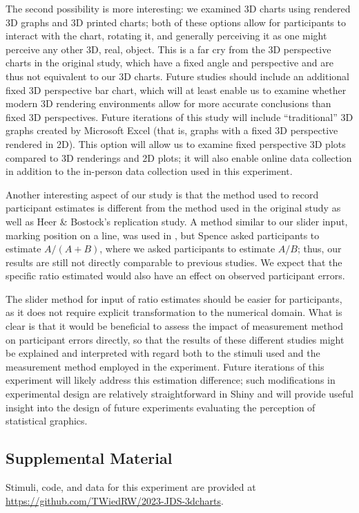 \documentclass[letterpaper,inpress,dvipsnames]{jdsart}
\providecommand{\DIFadd}[1]{{\protect\color{blue}\uwave{#1}}} %
\providecommand{\DIFaddbegin}{} %
\providecommand{\DIFaddend}{} %
\begin{document}
The second possibility is more interesting: we examined 3D charts using rendered 3D graphs and 3D printed charts; both of these options allow for participants to interact with the chart, rotating it, and generally perceiving it as one might perceive any other 3D, real, object.
This is a far cry from the 3D perspective charts in the original study, which have a fixed angle and perspective and are thus not equivalent to our 3D charts.
Future studies should include an additional fixed 3D perspective bar chart, which will at least enable us to examine whether modern 3D rendering environments allow for more accurate conclusions than fixed 3D perspectives. Future iterations of this study will include ``traditional'' 3D graphs created by Microsoft Excel (that is, graphs with a fixed 3D perspective rendered in 2D). This option will allow us to examine fixed perspective 3D plots compared to 3D renderings and 2D plots; it will also enable online data collection in addition to the in-person data collection used in this experiment.

Another interesting aspect of our study is that the method used to record participant estimates is different from the method used in the original study as well as Heer \& Bostock's replication study.
A method similar to our slider input, marking position on a line, was used in \citet{spenceVisualPsychophysicsSimple1990}, but Spence asked participants to estimate \(A/(A+B)\), where we asked participants to estimate \(A/B\); thus, our results are still not directly comparable to previous studies.
We expect that the specific ratio estimated would also have an effect on observed participant errors.

The slider method for input of ratio estimates should be easier for participants, as it does not require explicit transformation to the numerical domain.
What is clear is that it would be beneficial to assess the impact of \DIFaddbegin \DIFadd{the }\DIFaddend measurement method on participant errors directly, so that the results of these different studies might be explained and interpreted with regard both to the stimuli used and the measurement method employed in the experiment.
Future iterations of this experiment will likely address this estimation difference; such modifications in experimental design are relatively straightforward in Shiny and will provide useful insight into the design of future experiments evaluating the perception of statistical graphics.

\hypertarget{supplemental-material}{%
\subsection{Supplemental Material}\label{supplemental-material}}

Stimuli, code, and data for this experiment are provided at \url{https://github.com/TWiedRW/2023-JDS-3dcharts}.



\end{document}
